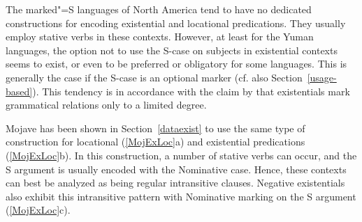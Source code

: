 The marked"=S languages of North America tend to have no dedicated constructions for encoding existential and locational predications. 
They usually employ stative verbs in these contexts. 
However, at least for the Yuman languages, the option not to use the S-case on subjects in existential contexts seems to exist, or even to be preferred or obligatory for some languages. This is generally the case if the S-case is an optional marker (cf. also Section~\ref{usage-based}). 
This tendency is in accordance with the claim by \citet[123]{Payne:1997} that existentials mark grammatical relations only to a limited degree.

Mojave has been shown in Section~\ref{dataexist} to use the same type of construction for locational (\ref{MojExLoc}a) and existential predications (\ref{MojExLoc}b).
In this construction, a number of stative verbs can occur, and the S argument is usually encoded with the Nominative case. 
Hence, these contexts can best be analyzed as being regular intransitive clauses.
Negative existentials also exhibit this intransitive pattern with Nominative marking on the S argument (\ref{MojExLoc}c).  



